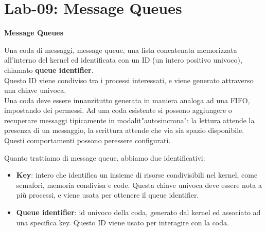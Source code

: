 \section{Lab-09: Message Queues}
\begin{flushleft}
  \textbf{Message Queues}\par 
  Una coda di messaggi, message queue, \ace una lista concatenata memorizzata 
  all'interno del kernel ed identificata con un ID (un intero positivo univoco), chiamato 
  \textbf{queue identifier}.\\ 
  Questo ID viene condiviso tra i processi interessati, e viene generato attraverso una 
  chiave univoca.\\
  Una coda deve essere innanzitutto generata in maniera analoga ad una FIFO, 
  impostando dei permessi. Ad una coda esistente si possono aggiungere o recuperare 
  messaggi tipicamente in modalit\aca "autosincrona": la lettura attende la presenza di un 
  messaggio, la scrittura attende che via sia spazio disponibile. Questi comportamenti 
  possono per\aco essere configurati.
  \begin{flushleft}
  Quanto trattiamo di message queue, abbiamo due identificativi:
  \begin{itemize}
    \item \textbf{Key}: intero che identifica un insieme di risorse condivisibili nel kernel, come 
          semafori, memoria condivisa e code. Questa chiave univoca deve essere nota a più 
          processi, e viene usata per ottenere il queue identifier.
    \item \textbf{Queue identifier}: id univoco della coda, generato dal kernel ed associato ad una 
          specifica key. Questo ID viene usato per interagire con la coda.
  \end{itemize}
  \end{flushleft}

\end{flushleft}
